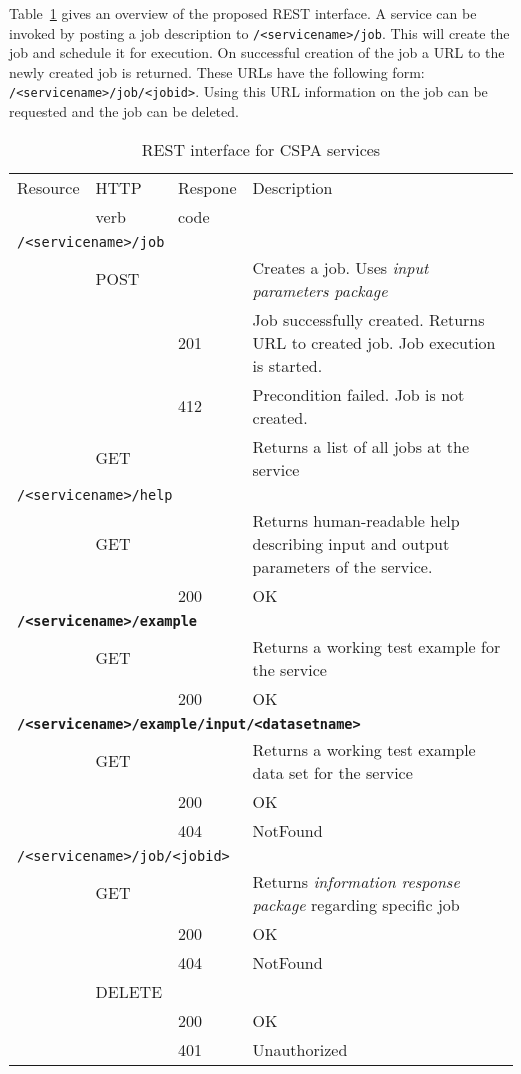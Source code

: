 \documentclass[a4paper]{article}
\begin{document}
Table~\ref{tab:interf} gives an overview of the proposed REST interface.  A
service can be invoked by posting a job description to
\texttt{/<servicename>/job}. This will create the job and schedule it for
execution. On successful creation of the job a URL to the newly created job is
returned. These URLs have the following form:
\texttt{/<servicename>/job/<jobid>}.  Using this URL information on the job can
be requested and the job can be deleted.

\begin{table}
  \caption{REST interface for CSPA services}
  \label{tab:interf}
  \begin{tabular}{l l l p{}}
    \toprule
    Resource & HTTP & Respone & Description \\
             & verb & code    &  \\

    \midrule
    \multicolumn{4}{l}{\texttt{/<servicename>/job}} \\
    & POST &  & Creates a job. Uses \emph{input parameters package} \\
    &   & 201 & Job successfully created. Returns URL to created job. Job execution is started. \\
    &   & 412 & Precondition failed. Job is not created.\\
    & GET  &  & Returns a list of all jobs at the service \\

    \multicolumn{4}{l}{\texttt{/<servicename>/help}} \\
    & GET &   & Returns human-readable help describing input and output parameters of the service. \\
    &   & 200  & OK \\

    \multicolumn{4}{l}{\bf\texttt{/<servicename>/example}} \\
    & GET &   & Returns a working test example for the service \\
    &   & 200  & OK \\

    \multicolumn{4}{l}{\bf\texttt{/<servicename>/example/input/<datasetname>}} \\
    & GET &   & Returns a working test example data set for the service \\
    &   & 200  & OK \\
    &   & 404  & NotFound \\

    \multicolumn{4}{l}{\texttt{/<servicename>/job/<jobid>}} \\
    & GET &    & Returns \emph{information response package} regarding specific job \\
    &   & 200  & OK \\
    &   & 404  & NotFound \\
    & DELETE & &  \\
    &   & 200  & OK \\
    &   & 401  & Unauthorized \\


\end{tabular}
\end{table}
\end{document}
